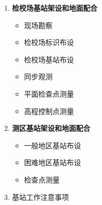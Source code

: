 \begin{enumerate}
	\item \textbf{检校场基站架设和地面配合}
		\begin{itemize}
			\item 现场勘察
			\item 检校场标识布设
			\item 检校场基站布设
			\item 同步观测
			\item 平面检查点测量
			\item 高程控制点测量
		\end{itemize}
	\item \textbf{测区基站架设和地面配合}
		\begin{itemize}
			\item 一般地区基站布设
			\item 困难地区基站布设
			\item 检查点测量
		\end{itemize}
	\item 基站工作注意事项
\end{enumerate}

